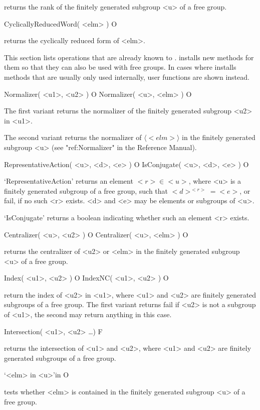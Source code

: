 returns the rank of the finitely generated subgroup <u> of a free
group.

\>CyclicallyReducedWord( <elm> ) O

returns the cyclically reduced form of <elm>.


This section lists operations that are already known to {\GAP}.
{\FGA} installs new methods for them so that they can also be used
with free groups.
In cases where {\FGA} installs methods that are usually only used
internally, user functions are shown instead.


\>Normalizer( <u1>, <u2> ) O
\>Normalizer( <u>, <elm> ) O

The first variant returns the normalizer of the finitely generated
subgroup <u2> in <u1>.

The second variant returns the normalizer of $\langle <elm> \rangle$
in the finitely generated subgroup <u> (see "ref:Normalizer" in the
Reference Manual).

\>RepresentativeAction( <u>, <d>, <e> ) O
\>IsConjugate( <u>, <d>, <e> ) O

`RepresentativeAction' returns an element $ <r> \in <u> $,
where <u> is a finitely generated subgroup of a free group, such
that $<d>^{<r>}=<e>$, or fail, if no such <r> exists.  <d> and <e> may
be elements or subgroups of <u>.

`IsConjugate' returns a boolean indicating whether such an element <r>
exists.

\>Centralizer( <u>, <u2> ) O
\>Centralizer( <u>, <elm> ) O

returns the centralizer of <u2> or <elm> in the finitely generated
subgroup <u> of a free group.

\>Index( <u1>, <u2> ) O
\>IndexNC( <u1>, <u2> ) O

return the index of <u2> in <u1>, where <u1> and <u2> are finitely
generated subgroups of a free group.  The first variant returns
fail if <u2> is not a subgroup of <u1>, the second may return
anything in this case.

\>Intersection( <u1>, <u2> \dots ) F

returns the intersection of <u1> and <u2>, where <u1> and <u2> are
finitely generated subgroups of a free group.

\>`<elm> in <u>'{in} O

tests whether <elm> is contained in the finitely generated subgroup
<u> of a free group.

